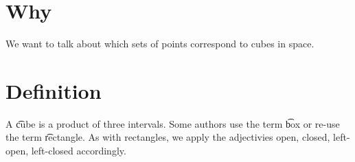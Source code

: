 

\section*{Why}

We want to talk about which sets of points correspond to cubes in space.

\section*{Definition}

A \t{cube} is a product of three intervals.
Some authors use the term \t{box} or re-use the term \t{rectangle}.
As with rectangles, we apply the adjectivies open, closed, left-open, left-closed accordingly.

\blankpage